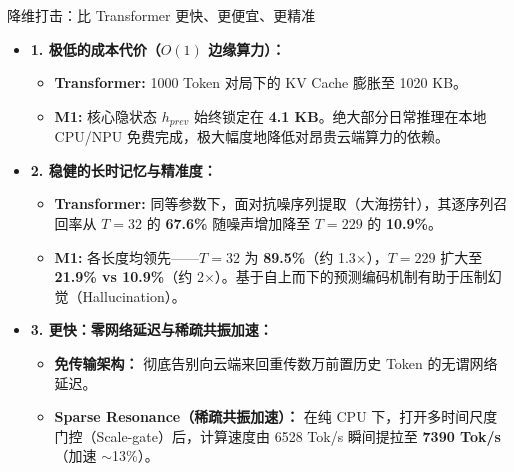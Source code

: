 ﻿\documentclass[aspectratio=169, 10pt]{beamer}
\begin{document}
\begin{frame}{降维打击：比 Transformer 更快、更便宜、更精准}
\begin{itemize}
    \item \textbf{1. 极低的成本代价（$O(1)$ 边缘算力）：}
    \begin{itemize}
        \item \textbf{Transformer:} 1000 Token 对局下的 KV Cache 膨胀至 1020 KB。
        \item \textbf{M1:} 核心隐状态 $h_{prev}$ 始终锁定在 \textbf{4.1 KB}。绝大部分日常推理在本地 CPU/NPU 免费完成，极大幅度地降低对昂贵云端算力的依赖。
    \end{itemize}
    \vspace{0.5em}
    \item \textbf{2. 稳健的长时记忆与精准度：}
    \begin{itemize}
        \item \textbf{Transformer:} 同等参数下，面对抗噪序列提取（大海捞针），其逐序列召回率从 $T=32$ 的 \textbf{67.6\%} 随噪声增加降至 $T=229$ 的 \textbf{10.9\%}。
        \item \textbf{M1:} 各长度均领先——$T=32$ 为 \textbf{89.5\%}（约 1.3$\times$），$T=229$ 扩大至 \textbf{21.9\% vs 10.9\%}（约 2$\times$）。基于自上而下的预测编码机制有助于压制幻觉（Hallucination）。
    \end{itemize}
    \vspace{0.5em}
    \item \textbf{3. 更快：零网络延迟与稀疏共振加速：}
    \begin{itemize}
        \item \textbf{免传输架构：} 彻底告别向云端来回重传数万前置历史 Token 的无谓网络延迟。
        \item \textbf{Sparse Resonance（稀疏共振加速）：} 在纯 CPU 下，打开多时间尺度门控（Scale-gate）后，计算速度由 6528 Tok/s 瞬间提拉至 \textbf{7390 Tok/s}（加速 $\sim$13\%）。
    \end{itemize}
\end{itemize}
\end{frame}
\end{document}
